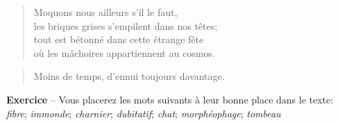   \begin{verse}
    Moquons nous ailleurs s’il le faut,\\
    les briques grises s’empilent dans nos têtes;\\
    tout est bétonné dans cette étrange fête\\
    où les mâchoires appartiennent au cosmos.
  \end{verse}
  \begin{verse}
    Moins de temps, d’ennui toujours davantage.
  \end{verse}
  \textbf{Exercice} -- Vous placerez les mots suivants à leur bonne place
  dans le texte:
  \textit{fibre}; \textit{immonde}; \textit{charnier}; \textit{dubitatif};
   \textit{chat}; \textit{morphéophage}; \textit{tombeau}

